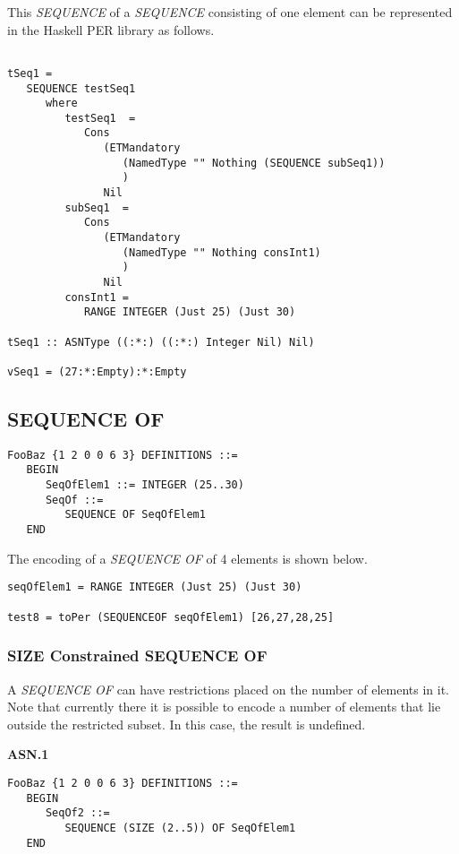 \documentclass{article}
\begin{document}
This {\em SEQUENCE} of a {\em SEQUENCE} consisting of one element
can be represented in the Haskell PER library as follows.

\begin{lstlisting}[frame=single]

tSeq1 = 
   SEQUENCE testSeq1 
      where
         testSeq1  = 
            Cons 
               (ETMandatory 
                  (NamedType "" Nothing (SEQUENCE subSeq1))
                  )
               Nil
         subSeq1  = 
            Cons 
               (ETMandatory 
                  (NamedType "" Nothing consInt1)
                  ) 
               Nil
         consInt1 = 
            RANGE INTEGER (Just 25) (Just 30)

tSeq1 :: ASNType ((:*:) ((:*:) Integer Nil) Nil)

vSeq1 = (27:*:Empty):*:Empty

\end{lstlisting}

\subsection{SEQUENCE OF}

\begin{lstlisting}[frame=single]
FooBaz {1 2 0 0 6 3} DEFINITIONS ::=
   BEGIN
      SeqOfElem1 ::= INTEGER (25..30)
      SeqOf ::=
         SEQUENCE OF SeqOfElem1
   END
\end{lstlisting}

The encoding of a {\em SEQUENCE OF} of 4 elements is shown
below.

\begin{lstlisting}[frame=single]
seqOfElem1 = RANGE INTEGER (Just 25) (Just 30)

test8 = toPer (SEQUENCEOF seqOfElem1) [26,27,28,25]
\end{lstlisting}

\subsubsection{SIZE Constrained SEQUENCE OF}

A {\em SEQUENCE OF} can have restrictions placed on the number
of elements in it. Note that currently there it is possible to
encode a number of elements that lie outside the restricted subset.
In this case, the result is undefined.

{\bf ASN.1}

\begin{lstlisting}[frame=single]
FooBaz {1 2 0 0 6 3} DEFINITIONS ::=
   BEGIN
      SeqOf2 ::=
         SEQUENCE (SIZE (2..5)) OF SeqOfElem1
   END
\end{lstlisting}
\end{document}
